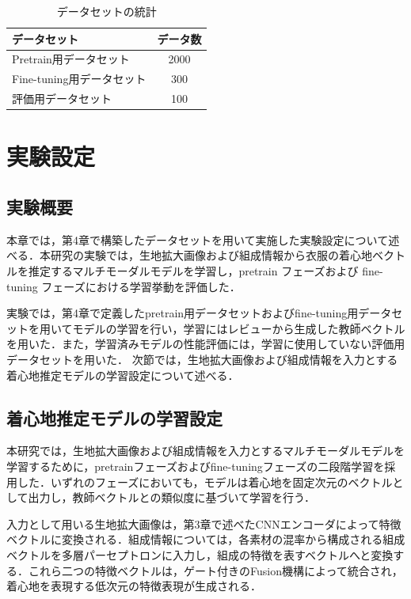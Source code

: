 \documentclass[a4paper,12pt]{jreport}
\begin{document}
\begin{table}[tbh]
\begin{center}
\caption{データセットの統計}
\vspace{7mm}
\label{tab:4.1}
\begin{tabular}{|l|c|}
\hline
データセット             & データ数 \\ \hline
Pretrain用データセット    & 2000 \\ \hline
Fine-tuning用データセット & 300  \\ \hline
評価用データセット          & 100  \\ \hline
\end{tabular}
\end{center}
\end{table}

\chapter{実験設定}

\section{実験概要}
本章では，第4章で構築したデータセットを用いて実施した実験設定について述べる．本研究の実験では，生地拡大画像および組成情報から衣服の着心地ベクトルを推定するマルチモーダルモデルを学習し，pretrain フェーズおよび fine-tuning フェーズにおける学習挙動を評価した．

実験では，第4章で定義したpretrain用データセットおよびfine-tuning用データセットを用いてモデルの学習を行い，学習にはレビューから生成した教師ベクトルを用いた．また，学習済みモデルの性能評価には，学習に使用していない評価用データセットを用いた．
次節では，生地拡大画像および組成情報を入力とする着心地推定モデルの学習設定について述べる． 

\section{着心地推定モデルの学習設定}
本研究では，生地拡大画像および組成情報を入力とするマルチモーダルモデルを学習するために，pretrainフェーズおよびfine-tuningフェーズの二段階学習を採用した．いずれのフェーズにおいても，モデルは着心地を固定次元のベクトルとして出力し，教師ベクトルとの類似度に基づいて学習を行う．

入力として用いる生地拡大画像は，第3章で述べたCNNエンコーダによって特徴ベクトルに変換される．組成情報については，各素材の混率から構成される組成ベクトルを多層パーセプトロンに入力し，組成の特徴を表すベクトルへと変換する．これら二つの特徴ベクトルは，ゲート付きのFusion機構によって統合され，着心地を表現する低次元の特徴表現が生成される．
\end{document}
